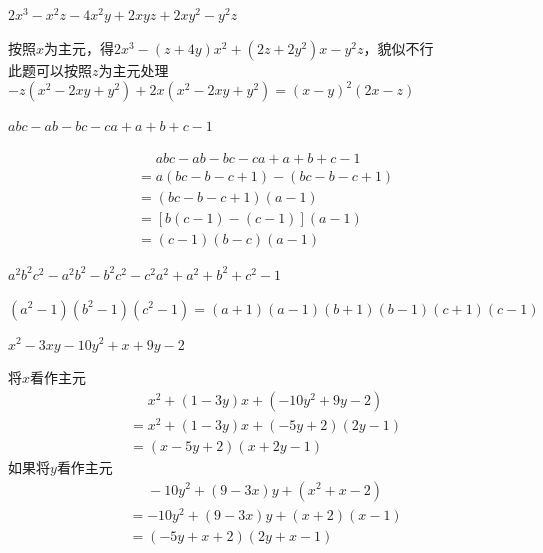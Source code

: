 \documentclass[windows,csize4,answers]{BHCexam}
\begin{document}
\begin{groups}
    \begin{questions}[]
        \question[5]$2x^3-x^2z-4x^2y+2xyz+2xy^2-y^2z$
        \begin{solution}{0.5cm}
            \methodonly 按照$x$为主元，得$2x^3-(z+4y)x^2+(2z+2y^2)x-y^2z$，貌似不行 \\
            此题可以按照$z$为主元处理 \\
            $-z(x^2-2xy+y^2)+2x(x^2-2xy+y^2)=(x-y)^2(2x-z)$
        \end{solution}
        \vspace{3.5cm}

        \question[5]$abc-ab-bc-ca+a+b+c-1$
        \begin{solution}{0.5cm}
            \methodonly
            \[
                \begin{aligned}
                     & \phantom{=}abc-ab-bc-ca+a+b+c-1 \\
                     & =a(bc-b-c+1)-(bc-b-c+1)         \\
                     & =(bc-b-c+1)(a-1)                \\
                     & =[b(c-1)-(c-1)](a-1)            \\
                     & =(c-1)(b-c)(a-1)
                \end{aligned}
            \]
        \end{solution}
        \vspace{3.5cm}

        \question[5]$a^2b^2c^2-a^2b^2-b^2c^2-c^2a^2+a^2+b^2+c^2-1$
        \begin{solution}{0.5cm}
            \methodonly $(a^2-1)(b^2-1)(c^2-1)=(a+1)(a-1)(b+1)(b-1)(c+1)(c-1)$
        \end{solution}
        \vspace{3.5cm}

        \question[5]$x^2-3xy-10y^2+x+9y-2$
        \begin{solution}{0.5cm}
            \methodonly 将$x$看作主元
            \[
                \begin{aligned}
                     & \phantom{=}x^2+(1-3y)x+(-10y^2+9y-2) \\
                     & =x^2+(1-3y)x+(-5y+2)(2y-1)           \\
                     & =(x-5y+2)(x+2y-1)
                \end{aligned}
            \]
            如果将$y$看作主元
            \[
                \begin{aligned}
                     & \phantom{=}-10y^2+(9-3x)y+(x^2+x-2) \\
                     & =-10y^2+(9-3x)y+(x+2)(x-1)          \\
                     & =(-5y+x+2)(2y+x-1)
                \end{aligned}
            \]
        \end{solution}
        \vspace{3.5cm}


\end{questions}
\end{groups}
\end{document}
